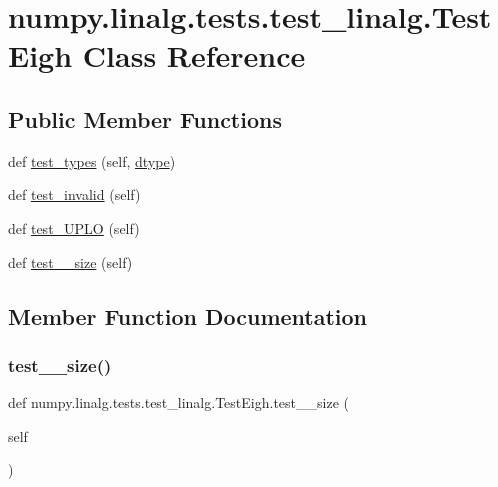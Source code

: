 \hypertarget{classnumpy_1_1linalg_1_1tests_1_1test__linalg_1_1TestEigh}{}\section{numpy.\+linalg.\+tests.\+test\+\_\+linalg.\+Test\+Eigh Class Reference}
\label{classnumpy_1_1linalg_1_1tests_1_1test__linalg_1_1TestEigh}
\subsection*{Public Member Functions}
\begin{DoxyCompactItemize}
\item 
def \hyperlink{classnumpy_1_1linalg_1_1tests_1_1test__linalg_1_1TestEigh_ab8475f816d15b785254ef78dfe9d1c53}{test\+\_\+types} (self, \hyperlink{namespacenumpy_1_1linalg_1_1tests_1_1test__linalg_a1063ea74fa35b7244592f8a89b8a71a2}{dtype})
\item 
def \hyperlink{classnumpy_1_1linalg_1_1tests_1_1test__linalg_1_1TestEigh_a57dcbb18bc702d05feecccb92e9b6fc4}{test\+\_\+invalid} (self)
\item 
def \hyperlink{classnumpy_1_1linalg_1_1tests_1_1test__linalg_1_1TestEigh_ad35b6fe1503455d6a417e130a7307b23}{test\+\_\+\+U\+P\+LO} (self)
\item 
def \hyperlink{classnumpy_1_1linalg_1_1tests_1_1test__linalg_1_1TestEigh_aec2dbf07c038a0cf206a6e6cc246e90e}{test\+\_\+\_\+size} (self)
\end{DoxyCompactItemize}


\subsection{Member Function Documentation}
\mbox{\label{classnumpy_1_1linalg_1_1tests_1_1test__linalg_1_1TestEigh_aec2dbf07c038a0cf206a6e6cc246e90e}} 
\subsubsection{\texorpdfstring{test\+\_\+\_\+size()}{test\_0\_size()}}
{\footnotesize\ttfamily def numpy.\+linalg.\+tests.\+test\+\_\+linalg.\+Test\+Eigh.\+test\+\_\+\_\+size (\begin{DoxyParamCaption}\item[{}]{self }\end{DoxyParamCaption})}

